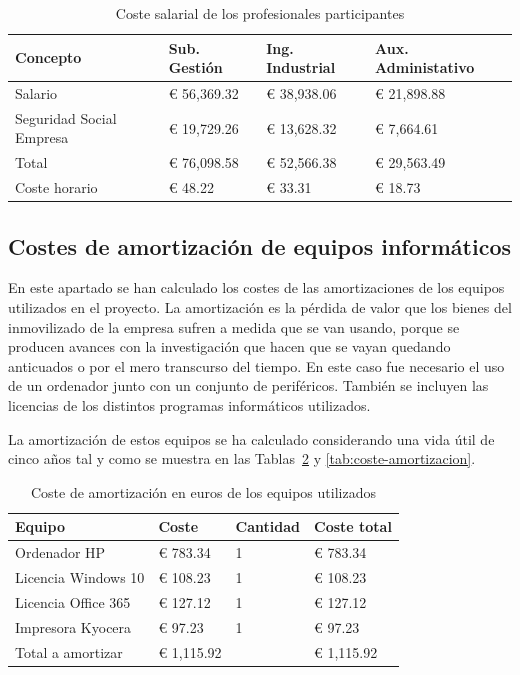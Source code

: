 \begin{table}[H]
    \centering
    \begin{tabular}{llll}
        \toprule
        Concepto                 & Sub. Gestión & Ing. Industrial & Aux. Administativo \\
        \midrule
        Salario                  & € 56,369.32  & € 38,938.06     & € 21,898.88        \\
        Seguridad Social Empresa & € 19,729.26  & € 13,628.32     & € 7,664.61         \\
        \midrule
        Total                    & € 76,098.58  & € 52,566.38     & € 29,563.49        \\
        Coste horario            & € 48.22      & € 33.31         & € 18.73            \\
        \bottomrule
    \end{tabular}
    \caption{Coste salarial de los profesionales participantes}
    \label{tab:salarios}
\end{table}

\subsection{Costes de amortización de equipos informáticos}

En este apartado se han calculado los costes de las amortizaciones de los equipos utilizados en el proyecto.
La amortización es la pérdida de valor que los bienes del inmovilizado de la empresa sufren a medida que se van usando, porque se producen avances con la investigación que hacen que se vayan quedando anticuados o por el mero transcurso del tiempo.
En este caso fue necesario el uso de un ordenador junto con un conjunto de periféricos.
También se incluyen las licencias de los distintos programas informáticos utilizados.

La amortización de estos equipos se ha calculado considerando una vida útil de cinco años tal y como se muestra en las Tablas~\ref{tab:coste-equipos} y \ref{tab:coste-amortizacion}.

\begin{table}[H]
    \centering
    \begin{tabular}{llll}
        \toprule
        Equipo              & Coste      & Cantidad & Coste total \\
        \midrule
        Ordenador HP        & € 783.34   & 1        & € 783.34    \\
        Licencia Windows 10 & € 108.23   & 1        & € 108.23    \\
        Licencia Office 365 & € 127.12   & 1        & € 127.12    \\
        Impresora Kyocera   & € 97.23    & 1        & € 97.23     \\
        \midrule
        Total a amortizar   & € 1,115.92 &          & € 1,115.92  \\
        \bottomrule
    \end{tabular}
    \caption{Coste de amortización en euros de los equipos utilizados}
    \label{tab:coste-equipos}
\end{table}


